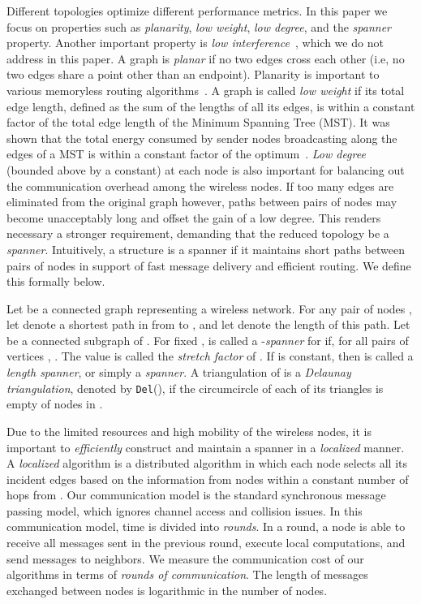 \documentclass{llncs}
\newcommand{\del}{{\tt Del}}
\begin{document}
Different topologies optimize different performance metrics. In this
paper we focus on properties such as \emph{planarity}, \emph{low weight},
\emph{low degree}, and the \emph{spanner} property.
Another important property is
\emph{low interference}~\cite{BRWZ04,JC05,RSWZ05}, which we do not address
in this paper.
A graph is \emph{planar} if no two edges cross each other (i.e, no two edges
share a point other than an endpoint). Planarity is important to various
memoryless routing algorithms~\cite{KarpKung00,BMSU01}.
A graph is called \emph{low weight} if its total edge length,
defined as the sum of the lengths of all its edges, is within a constant
factor of the total edge length of the Minimum Spanning Tree (MST). It was
shown that the total energy consumed by sender nodes broadcasting along
the edges of a MST is within a constant factor of the
optimum~\cite{MSTBroadcast02}. \emph{Low degree} (bounded above by a constant) at each node is also
important for balancing
out the communication overhead among the wireless nodes. If too many edges are eliminated from the original graph however, paths
between pairs of nodes may become unacceptably long and offset the gain
of a low degree. This renders necessary a stronger requirement,
demanding that the reduced topology be a \emph{spanner}.
Intuitively, a structure is a spanner if it maintains
short paths between pairs of nodes in support of fast message delivery and
efficient routing. We define this formally below.

Let  be a connected graph representing a wireless network.
For any pair of nodes , let  denote a shortest path in  from  to , and let  denote
the length of this path. Let  be a
connected subgraph of . For fixed ,  is called a
-\emph{spanner} for  if, for all pairs
of vertices , . The
value  is called the \emph{stretch factor} of . If  is constant,
then  is called a \emph{length spanner}, or simply a \emph{spanner}.
A triangulation of  is a \emph{Delaunay triangulation},
denoted by \del(), if the
circumcircle of each of its triangles is empty of nodes in .


Due to the limited resources and high mobility of the wireless nodes, it is
important to \emph{efficiently} construct and maintain a spanner in a \emph{localized} manner.
A \emph{localized} algorithm is a distributed
algorithm in which each node  selects all its incident edges based
on the information from nodes within a constant number of hops from .
Our communication model is the standard synchronous message passing model,
which ignores channel access and collision issues. In this communication model,
time is divided into \emph{rounds}. In a round, a node is able to receive all
messages sent in the previous round, execute local computations, and send messages
to neighbors. We measure the communication cost of our algorithms in terms of
\emph{rounds of communication}. The length of messages exchanged
between nodes is logarithmic in the number of nodes.
\end{document}
